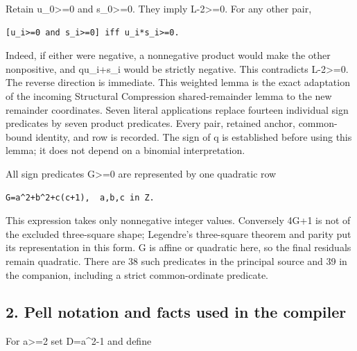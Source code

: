 Retain u\_\allowbreak{}0\textgreater{}\allowbreak{}=\allowbreak{}0 and s\_\allowbreak{}0\textgreater{}\allowbreak{}=\allowbreak{}0. They imply L-2\textgreater{}\allowbreak{}=\allowbreak{}0. For any other pair,



\begin{verbatim}
[u_i>=0 and s_i>=0] iff u_i*s_i>=0.
\end{verbatim}

Indeed, if either were negative, a nonnegative product would make the other nonpositive, and q\textasteriskcentered{}\allowbreak{}u\_\allowbreak{}i+\allowbreak{}s\_\allowbreak{}i would be strictly negative. This contradicts L-2\textgreater{}\allowbreak{}=\allowbreak{}0. The reverse direction is immediate. This weighted lemma is the exact adaptation of the incoming Structural Compression shared-remainder lemma to the new remainder coordinates. Seven literal applications replace fourteen individual sign predicates by seven product predicates. Every pair, retained anchor, common-bound identity, and row is recorded. The sign of q is established before using this lemma; it does not depend on a binomial interpretation.



All sign predicates G\textgreater{}\allowbreak{}=\allowbreak{}0 are represented by one quadratic row



\begin{verbatim}
G=a^2+b^2+c(c+1),  a,b,c in Z.
\end{verbatim}

This expression takes only nonnegative integer values. Conversely 4G+\allowbreak{}1 is not of the excluded three-square shape; Legendre's three-square theorem and parity put its representation in this form. G is affine or quadratic here, so the final residuals remain quadratic. There are 38 such predicates in the principal source and 39 in the companion, including a strict common-ordinate predicate.



\subsection*{2. Pell notation and facts used in the compiler}



For a\textgreater{}\allowbreak{}=\allowbreak{}2 set D=\allowbreak{}a\textasciicircum{}\allowbreak{}2-1 and define




